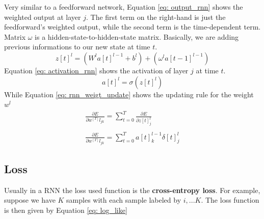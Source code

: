 \documentclass[11pt]{article}
\begin{document}
Very similar to a feedforward network, Equation \ref{eq: output_rnn} shows the weighted output at layer $j$. The first term on the right-hand is just the feedforward's weighted output, while the second term is the time-dependent term. Matrix $\omega$ is a hidden-state-to-hidden-state matrix. Basically, we are adding previous informations to our new state at time $t$.
\begin{equation}
z[t]^l = (W^la[t]^{l -1}+ b^l) + (\omega^l a[t-1]^{l-1})
\label{eq: output_rnn}	
\end{equation}
Equation \ref{eq: activation_rnn} shows the activation of layer $j$ at time $t$.
\begin{equation}
a[t]^l	= \sigma(z[t]^l)
\label{eq: activation_rnn}
\end{equation}
While Equation \ref{eq: rnn_weigt_update} shows the updating rule for the weight $w^l$
\begin{equation}
\begin{matrix}
\frac{\partial E}{\partial w^[T]l_{jk}} =\sum^T_{t=0} \frac{\partial E}{\partial z[t]^l_j}	\\ 
\\
\frac{\partial E}{\partial w^[T]l_{jk}} = \sum^T_{t=0} a[t]^{l-1}_k \delta[t]^l_j	
\end{matrix}
\label{eq: rnn_weigt_update}
\end{equation}
\subsection{Loss}
Usually in a RNN the loss used function is the \textbf{cross-entropy loss}. For example, suppose we have $K$ samples with each sample labeled by $i, ... K$. The loss function is then given by Equation \ref{eq: log_like}

 
\end{document}
